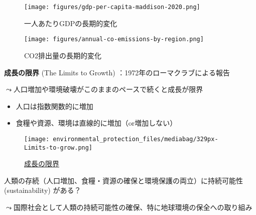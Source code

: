 \documentclass[
  xelatex,
  ja=standard]{bxjsarticle}
\providecommand{\tightlist}{%
  \setlength{\itemsep}{0pt}\setlength{\parskip}{0pt}}\usepackage{longtable,booktabs,array}
\begin{document}
\begin{figure}[htpb]

{\centering \texttt{[image: figures/gdp-per-capita-maddison-2020.png]}

}

\caption{一人あたりGDPの長期的変化}

\end{figure}

\begin{figure}[htpb]

{\centering \texttt{[image: figures/annual-co-emissions-by-region.png]}

}

\caption{CO2排出量の長期的変化}

\end{figure}

\textbf{成長の限界} (The Limits to Growth)
：1972年のローマクラブによる報告

\(\leadsto\)人口増加や環境破壊がこのままのペースで続くと成長が限界

\begin{itemize}
\tightlist
\item
  人口は指数関数的に増加
\item
  食糧や資源、環境は直線的に増加（or増加しない）
\end{itemize}

\begin{figure}[htpb]

{\centering \texttt{[image: environmental\_protection\_files/mediabag/329px-Limits-to-grow.png]}

}

\caption{\href{https://commons.wikimedia.org/wiki/File:Limits-to-growth-figure-35.svg}{成長の限界}}

\end{figure}

人類の存続（人口増加、食糧・資源の確保と環境保護の両立）に持続可能性
(sustainability) がある？

\(\leadsto\)国際社会として人類の持続可能性の確保、特に地球環境の保全への取り組み
\end{document}
